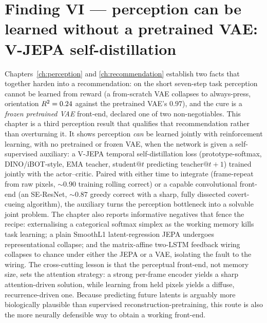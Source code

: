\chapter{Finding VI --- perception can be learned without a pretrained VAE: V-JEPA self-distillation}
\label{ch:jepa}

Chapters~\ref{ch:perception} and \ref{ch:recommendation} establish two facts that
together harden into a recommendation: on the short seven-step task perception cannot be
learned from reward (a from-scratch VAE collapses to always-press, orientation
$R^{2}=0.24$ against the pretrained VAE's $0.97$), and the cure is a \emph{frozen
pretrained VAE} front-end, declared one of two non-negotiables. This chapter is a third
perception result that qualifies that recommendation rather than overturning it. It shows
perception \emph{can} be learned jointly with reinforcement learning, with no pretrained or
frozen VAE, when the network is given a self-supervised auxiliary: a V-JEPA temporal
self-distillation loss (prototype-softmax, DINO/iBOT-style, EMA teacher, student$@t$
predicting teacher$@t{+}1$) trained jointly with the actor--critic. Paired with either time
to integrate (frame-repeat from raw pixels, $\sim0.90$ training rolling correct) or a
capable convolutional front-end (an SE-ResNet, $\sim0.87$ greedy correct with a sharp,
fully dissected covert-cueing algorithm), the auxiliary turns the perception bottleneck
into a solvable joint problem. The chapter also reports informative negatives that fence the
recipe: externalising a categorical softmax simplex as the working memory kills task
learning; a plain SmoothL1 latent-regression JEPA undergoes representational collapse; and
the matrix-affine two-LSTM feedback wiring collapses to chance under either the JEPA or a
VAE, isolating the fault to the wiring. The cross-cutting lesson is that the perceptual
front-end, not memory size, sets the attention strategy: a strong per-frame encoder yields a
sharp attention-driven solution, while learning from held pixels yields a diffuse,
recurrence-driven one. Because predicting future latents is arguably more biologically
plausible than supervised reconstruction-pretraining, this route is also the more neurally
defensible way to obtain a working front-end.

